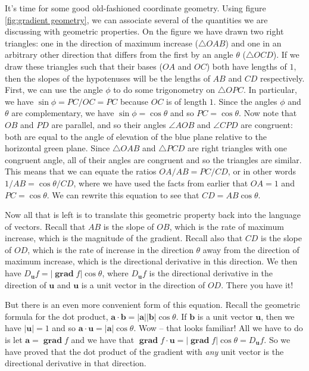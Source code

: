 \documentclass{myarticle}
\DeclareMathOperator{\grad}{\mathbf{grad}}
\renewcommand{\vec}[1]{\mathbf{#1}}
\theoremstyle{nospace}
\newtheorem{old series theorem}{Theorem}
\newenvironment{series theorem}
{\begin{mdframed}\begin{old series theorem}}
    {\end{old series theorem}\end{mdframed}}
\begin{document}
It's time for some good old-fashioned coordinate geometry. Using
figure \ref{fig:gradient geometry}, we can associate several of the
quantities we are discussing with geometric properties. On the figure
we have drawn two right triangles: one in the direction of maximum
increase ($\bigtriangleup OAB$) and one in an arbitrary other
direction that differs from the first by an angle $\theta$
($\bigtriangleup OCD$). If we draw these triangles such that their
bases ($OA$ and $OC$) both have lengths of $1$, then the slopes of the
hypotenuses will be the lengths of $AB$ and $CD$ respectively. First,
we can use the angle $\phi$ to do some trigonometry on
$\bigtriangleup OPC$. In particular, we have $\sin \phi = PC/OC = PC$
because $OC$ is of length $1$. Since the angles $\phi$ and $\theta$
are complementary, we have $\sin \phi = \cos \theta$ and so
$PC = \cos \theta$. Now note that $OB$ and $PD$ are parallel, and so
their angles $\angle AOB$ and $\angle CPD$ are congruent: both are
equal to the angle of elevation of the blue plane relative to the
horizontal green plane. Since $\bigtriangleup OAB$ and
$\bigtriangleup PCD$ are right triangles with one congruent angle, all
of their angles are congruent and so the triangles are similar. This
means that we can equate the ratios $OA/AB = PC/CD$, or in other words
$1/AB = \cos \theta/CD$, where we have used the facts from earlier
that $OA = 1$ and $PC = \cos \theta$. We can rewrite this equation to
see that $CD = AB \cos \theta$.

Now all that is left is to translate this geometric property back into
the language of vectors. Recall that $AB$ is the slope of $OB$, which
is the rate of maximum increase, which is the magnitude of the
gradient. Recall also that $CD$ is the slope of $OD$, which is the
rate of increase in the direction $\theta$ away from the direction of
maximum increase, which is the directional derivative in this
direction. We then have $D_{\vec u} f = |\grad f| \cos \theta$, where
$D_{\vec u} f$ is the directional derivative in the direction of
$\vec{u}$ and $\vec{u}$ is a unit vector in the direction of $OD$.
There you have it!

But there is an even more convenient form of this equation. Recall the
geometric formula for the dot product,
$\vec{a} \cdot \vec{b} = |\vec{a}| |\vec{b}| \cos \theta$. If
$\vec{b}$ is a unit vector $\vec{u}$, then we have $|\vec{u}| = 1$ and
so $\vec{a} \cdot \vec{u} = |\vec{a}| \cos \theta$. Wow -- that looks
familiar! All we have to do is let $\vec{a} = \grad f$ and we have
that $\grad f \cdot \vec{u} = |\grad f| \cos \theta = D_{\vec{u}} f$.
So we have proved that the dot product of the gradient with
\textit{any} unit vector is the directional derivative in that
direction.
\end{document}
